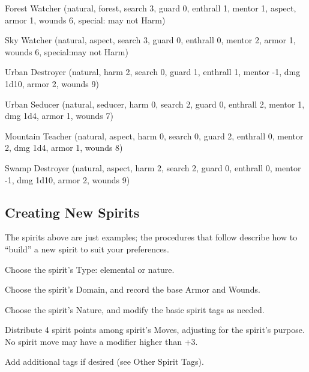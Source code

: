 Forest Watcher (natural, forest, search 3, guard 0, enthrall 1, mentor 1, aspect, armor 1, wounds 6, special: may not Harm)

Sky Watcher (natural, aspect, search 3, guard 0, enthrall 0, mentor 2, armor 1, wounds 6, special:may not Harm)

Urban Destroyer (natural, harm 2, search 0, guard 1, enthrall 1, mentor -1, dmg 1d10, armor 2, wounds 9)

Urban Seducer (natural, seducer, harm 0, search 2, guard 0, enthrall 2, mentor 1, dmg 1d4, armor 1, wounds 7)

Mountain Teacher (natural, aspect, harm 0, search 0, guard 2, enthrall 0, mentor 2, dmg 1d4, armor 1, wounds 8)

Swamp Destroyer (natural, aspect, harm 2, search 2, guard 0, enthrall 0, mentor -1, dmg 1d10, armor 2, wounds 9)

\subsection{Creating New Spirits}
The spirits above are just examples; the procedures that follow describe how to “build” a new spirit to suit your preferences.

Choose the spirit’s Type: elemental or nature.

Choose the spirit’s Domain, and record the base Armor and Wounds.

Choose the spirit’s Nature, and modify the basic spirit tags as needed.

Distribute 4 spirit points among spirit’s Moves, adjusting for the spirit’s purpose. No spirit move may have a modifier higher than +3.

Add additional tags if desired (see Other Spirit Tags).




